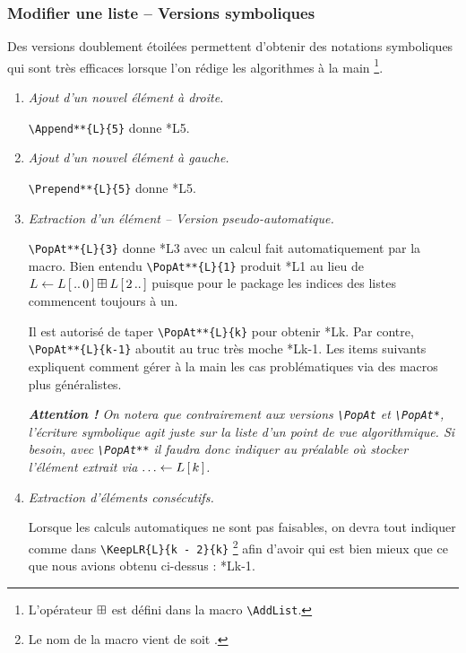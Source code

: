 \documentclass[12pt,a4paper]{article}
\begin{document}
\subsubsection{Modifier une liste -- Versions symboliques}

Des versions doublement étoilées permettent d'obtenir des notations symboliques qui sont très efficaces lorsque l'on rédige les algorithmes à la main
\footnote{
	L'opérateur $\mathbin{\boxplus}$ est défini dans la macro \texttt{\textbackslash{}AddList}.
}.

\begin{enumerate}
	\item \textit{Ajout d'un nouvel élément à droite.}

	      \verb+\Append**{L}{5}+ donne \Append**{L}{5}.


	\item \textit{Ajout d'un nouvel élément à gauche.}

	      \verb+\Prepend**{L}{5}+ donne \Prepend**{L}{5}.


	\item \textit{Extraction d'un élément -- Version pseudo-automatique.}

	      \verb+\PopAt**{L}{3}+ donne \PopAt**{L}{3} avec un calcul fait automatiquement par la macro.
	      Bien entendu \verb+\PopAt**{L}{1}+ produit \PopAt**{L}{1} au lieu de $L \Store \ListUntil{L}{0} \AddList \ListFrom{L}{2}$ puisque pour le package les indices des listes commencent toujours à un.
	      
	      Il est autorisé de taper \verb+\PopAt**{L}{k}+ pour obtenir \PopAt**{L}{k}. Par contre, \verb+\PopAt**{L}{k-1}+ aboutit au truc très moche \PopAt**{L}{k-1}. 
	      Les items suivants expliquent comment gérer à la main les cas problématiques via des macros plus généralistes.

	      \smallskip

	      \emph{\textbf{Attention !} On notera que contrairement aux versions \emph{\texttt{\textbackslash{}PopAt}} et \emph{\texttt{\textbackslash{}PopAt*}}, l'écriture symbolique agit juste sur la liste d'un point de vue algorithmique. Si besoin, avec \emph{\texttt{\textbackslash{}PopAt**}} il faudra donc indiquer au préalable où stocker l'élément extrait via $\dots \Store \ListElt{L}{k}$.}


	\item \textit{Extraction d'éléments consécutifs.}

	      Lorsque les calculs automatiques ne sont pas faisables, on devra tout indiquer comme dans \verb+\KeepLR{L}{k - 2}{k}+
	      \footnote{
	      	Le nom de la macro vient de  soit .
		  }
		  afin d'avoir  qui est bien mieux que ce que nous avions obtenu ci-dessus : \PopAt**{L}{k-1}.



\end{enumerate}
\end{document}
